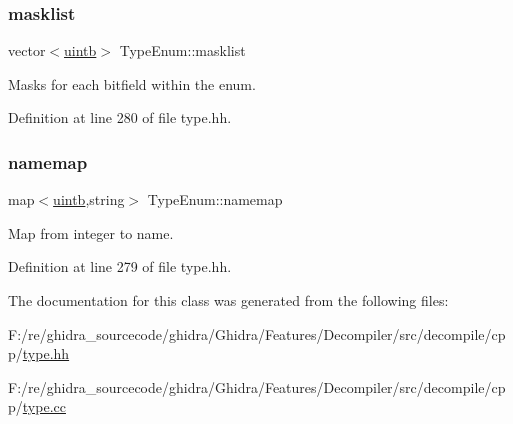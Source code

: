 \subsubsection{\texorpdfstring{masklist}{masklist}}
{\footnotesize\ttfamily vector$<$\mbox{\hyperlink{types_8h_a2db313c5d32a12b01d26ac9b3bca178f}{uintb}}$>$ Type\+Enum\+::masklist\hspace{0.3cm}{\ttfamily [protected]}}



Masks for each bitfield within the enum. 



Definition at line 280 of file type.\+hh.

\mbox{\label{class_type_enum_af66c4e826f409305dd0114399b9dcdf2}} 
\subsubsection{\texorpdfstring{namemap}{namemap}}
{\footnotesize\ttfamily map$<$\mbox{\hyperlink{types_8h_a2db313c5d32a12b01d26ac9b3bca178f}{uintb}},string$>$ Type\+Enum\+::namemap\hspace{0.3cm}{\ttfamily [protected]}}



Map from integer to name. 



Definition at line 279 of file type.\+hh.



The documentation for this class was generated from the following files\+:\begin{DoxyCompactItemize}
\item 
F\+:/re/ghidra\+\_\+sourcecode/ghidra/\+Ghidra/\+Features/\+Decompiler/src/decompile/cpp/\mbox{\hyperlink{type_8hh}{type.\+hh}}\item 
F\+:/re/ghidra\+\_\+sourcecode/ghidra/\+Ghidra/\+Features/\+Decompiler/src/decompile/cpp/\mbox{\hyperlink{type_8cc}{type.\+cc}}\end{DoxyCompactItemize}
